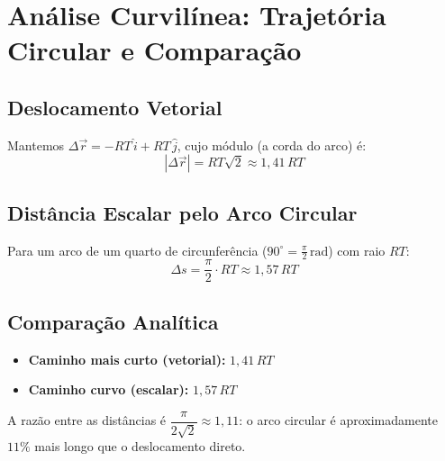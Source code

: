 \documentclass[10.5pt, a4paper]{extarticle}
\begin{document}
\section{Análise Curvilínea: Trajetória Circular e Comparação}

\subsection{Deslocamento Vetorial}

Mantemos $\Delta\vec{r} = -RT\,\hat{i} + RT\,\hat{j}$, cujo módulo (a corda do arco) é:
\[
  |\Delta\vec{r}| = RT\sqrt{2} \approx 1{,}41\,RT
\]

\subsection{Distância Escalar pelo Arco Circular}

Para um arco de um quarto de circunferência ($90^\circ = \frac{\pi}{2}\,\text{rad}$) com raio $RT$:
\[
  \Delta s = \frac{\pi}{2}\cdot RT \approx 1{,}57\,RT
\]

\subsection{Comparação Analítica}

\begin{itemize}
  \item \textbf{Caminho mais curto (vetorial):} $1{,}41\,RT$
  \item \textbf{Caminho curvo (escalar):} $1{,}57\,RT$
\end{itemize}

A razão entre as distâncias é $\dfrac{\pi}{2\sqrt{2}} \approx 1{,}11$: o arco circular é aproximadamente $11\%$ mais longo que o deslocamento direto.

\begin{center}
\end{center}
\end{document}
